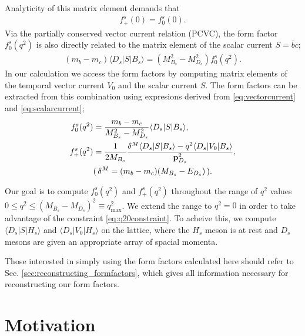 Analyticity of this matrix element demands that
\begin{align}
  f_+^s(0) = f_0^s(0).
  \label{eq:q20constraint}
\end{align}
Via the partially conserved vector current relation (PCVC), the form factor $f_0^s(q^2)$ is also directly related to the matrix element of the scalar current $S=\bar{b}c$;
\begin{align}
  (m_b-m_c)\langle D_s | S | B_s \rangle = (M^2_{B_s} - M^2_{D_s}) f_0^s(q^2).
    \label{eq:scalarcurrent}
\end{align}
In our calculation we access the form factors by computing matrix elements of the temporal vector current $V_0$ and the scalar current $S$. The form factors can be extracted from this combination using expresions derived from \eqref{eq:vectorcurrent} and \eqref{eq:scalarcurrent};
\begin{align}
  f_0^s(q^2) &= {m_b - m_c\over M_{B_s}^2 - M_{D_s}^2 } \langle D_s | S | B_s \rangle, \\
  f_+^s(q^2) &= {1\over 2M_{B_s}} { \delta^M \langle D_s | S | B_s \rangle - q^2 \langle D_s | V_0 | B_s \rangle \over {\bf{p}}^2_{D_s}}, \\
    &( \, \delta^M = (m_b - m_c)(M_{B_s}-E_{D_s}) \, ). \nonumber
\end{align}

Our goal is to compute $f_0^s(q^2)$ and $f_+^s(q^2)$ throughout the range of $q^2$ values $0 \leq q^2 \leq (M_{B_s}-M_{D_s})^2 \equiv q^2_{\text{max}}$. We extend the range to $q^2=0$ in order to take advantage of the constraint \eqref{eq:q20constraint}. To acheive this, we compute $\langle D_s | S | H_s \rangle$ and $\langle D_s | V_0 | H_s \rangle$ on the lattice, where the $H_s$ meson is at rest and $D_s$ mesons are given an appropriate array of spacial momenta.

Those interested in simply using the form factors calculated here should refer to Sec. \ref{sec:reconstructing_formfactors}, which gives all information necessary for reconstructing our form factors.

\section{Motivation}
\label{sec:BsDs_intro}


